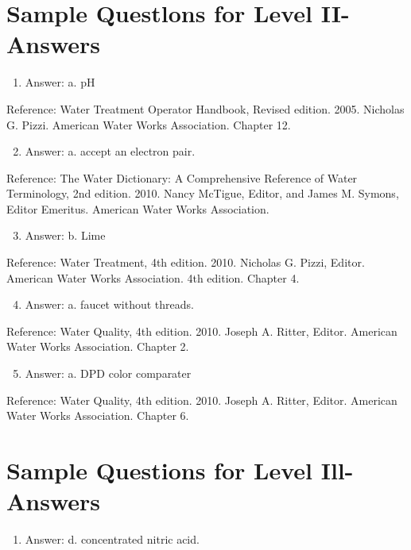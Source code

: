\documentclass[10pt]{article}
\begin{document}
\section{Sample Questlons for Level II-Answers}
\begin{enumerate}
  \item Answer: a. $\mathrm{pH}$
\end{enumerate}

Reference: Water Treatment Operator Handbook, Revised edition. 2005. Nicholas G. Pizzi. American Water Works Association. Chapter 12.

\begin{enumerate}
  \setcounter{enumi}{1}
  \item Answer: a. accept an electron pair.
\end{enumerate}

Reference: The Water Dictionary: A Comprehensive Reference of Water Terminology, 2nd edition. 2010. Nancy McTigue, Editor, and James M. Symons, Editor Emeritus. American Water Works Association.

\begin{enumerate}
  \setcounter{enumi}{2}
  \item Answer: b. Lime
\end{enumerate}

Reference: Water Treatment, 4th edition. 2010. Nicholas G. Pizzi, Editor. American Water Works Association. 4th edition. Chapter 4.

\begin{enumerate}
  \setcounter{enumi}{3}
  \item Answer: a. faucet without threads.
\end{enumerate}

Reference: Water Quality, 4th edition. 2010. Joseph A. Ritter, Editor. American Water Works Association. Chapter 2.

\begin{enumerate}
  \setcounter{enumi}{4}
  \item Answer: a. DPD color comparater
\end{enumerate}

Reference: Water Quality, 4th edition. 2010. Joseph A. Ritter, Editor. American Water Works Association. Chapter 6.

\section{Sample Questions for Level Ill-Answers}
\begin{enumerate}
  \item Answer: d. concentrated nitric acid.
\end{enumerate}
\end{document}
